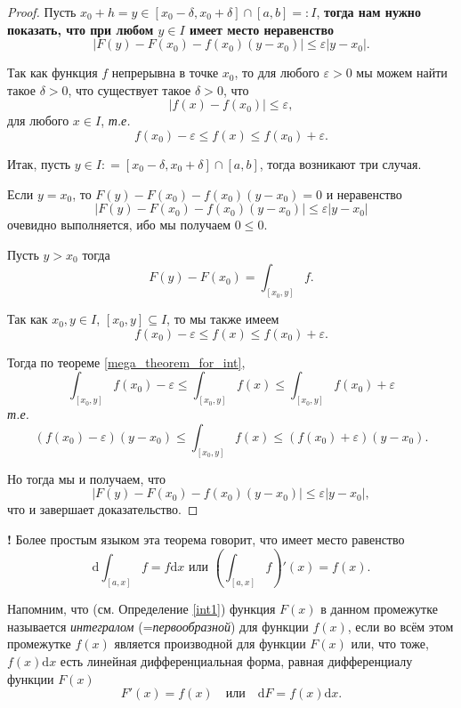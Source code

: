 \begin{proof}
Пусть $x_0 + h = y \in [x_0 - \delta, x_0 + \delta] \cap [a,b] =: I$, \textbf{тогда нам нужно показать, что при любом $y \in I$ имеет место неравенство}
\[
 \left| F(y) - F(x_0) - f(x_0) (y-x_0) \right| \le \varepsilon |y-x_0|.
\]

Так как функция $f$ непрерывна в точке $x_0$, то для любого $\varepsilon >0$ мы можем найти такое $\delta>0$, что существует такое $\delta >0$, что 
\[
 |f(x) - f(x_0)| \le \varepsilon,
\]
для любого $x \in I$, \textit{т.е.}
\[
 f(x_0) - \varepsilon \le f(x) \le f(x_0) + \varepsilon.
\]

Итак, пусть $y \in I : = [x_0 - \delta, x_0 + \delta] \cap [a,b]$, тогда возникают три случая. 

Если $y = x_0$, то $F(y) - F(x_0) - f(x_0)(y-x_0) = 0$ и неравенство
\[
 \left| F(y) - F(x_0) - f(x_0) (y-x_0) \right| \le \varepsilon |y-x_0|
\]
очевидно выполняется, ибо мы получаем $0 \le 0.$

Пусть $y>x_0$ тогда
\[
 F(y) - F(x_0) = \int_{[x_0,y]}f.
\]

Так как $x_0,y \in I$, $[x_0,y] \subseteq I$, то мы также имеем
\[
 f(x_0) - \varepsilon \le f(x) \le f(x_0) + \varepsilon.
\]

Тогда по теореме \ref{mega_theorem_for_int},
\[
\int_{[x_0,y]} f(x_0) - \varepsilon \le \int_{[x_0,y]}f(x) \le \int_{[x_0,y]} f(x_0) + \varepsilon
\]
\textit{т.е.}
\[
\left( f(x_0) - \varepsilon\right) (y-x_0) \le \int_{[x_0,y]}f(x) \le \left(f(x_0) + \varepsilon\right)(y-x_0).
\]

Но тогда мы и получаем, что
\[
 \left| F(y) - F(x_0) - f(x_0) (y-x_0) \right| \le \varepsilon |y-x_0|,
\]
что и завершает доказательство.
\end{proof}


\begin{mydanger}{\bf !}
    Более простым языком эта теорема говорит, что имеет место равенство
    \[
     \mathrm{d} \int_{[a,x]}f = f\mathrm{d}x \mbox{ или } \left( \int_{[a,x]}f \right)'(x) = f(x).
    \]
\end{mydanger}


Напомним, что (см. Определение \ref{int1}) функция $F(x)$ в данном промежутке называется \textit{интегралом} (=\textit{первообразной}) для функции $f(x)$, если во всём этом промежутке $f(x)$ является производной для функции $F(x)$ или, что тоже, $f(x)\mathrm{d}x$ есть линейная дифференциальная форма, равная дифференциалу функции $F(x)$
    \[
     F'(x) = f(x) \quad \mbox{или} \quad  \mathrm{d}F = f(x) \mathrm{d}x.
    \]

